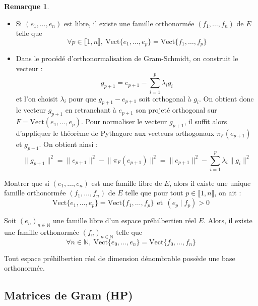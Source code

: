 \documentclass[french]{article}
\newcommand{\N}{\mathbb{N}}
\theoremstyle{plain}
\theoremstyle{definition}
\newtheorem*{rmq}{Remarque}
\theoremstyle{remark}
\begin{document}
\begin{rmq}
	\begin{itemize}
		\item Si $(e_1,\ldots,e_n)$ est libre, il existe une famille orthonormée $(f_1,\ldots,f_n)$ de $E$ telle que $$\forall p\in\llbracket 1,n\rrbracket,\ \text{Vect}\{e_1,\ldots,e_p\}=\text{Vect}\{f_1,\ldots,f_p\}$$
		\item Dans le procédé d'orthonormalisation de Gram-Schmidt, on construit le vecteur : $$g_{p+1}=e_{p+1}-\sum_{i=1}^{p}\lambda_ig_i$$ et l'on choisit $\lambda_i$ pour que $g_{p+1}-e_{p+1}$ soit orthogonal à $g_i$. On obtient donc le vecteur $g_{p+1}$ en retranchant à $e_{p+1}$ son projeté orthogonal sur $F=\text{Vect}(e_1,\ldots,e_p)$. Pour normaliser le vecteur $g_{p+1}$, il suffit alors d'appliquer le théorème de Pythagore aux vecteurs orthogonaux $\pi_F(e_{p+1})$ et $g_{p+1}$. On obtient ainsi : $$\lVert g_{p+1}\rVert^2=\lVert e_{p+1}\rVert^2-\lVert\pi_F(e_{p+1})\rVert^2=\lVert e_{p+1}\rVert^2-\sum_{i=1}^{p}\lambda_i\lVert g_i\rVert^2$$
	\end{itemize}
\end{rmq}

\begin{exo}
	Montrer que si $(e_1,\ldots,e_n)$ est une famille libre de $E$, alors il existe une unique famille orthonormée $(f_1,\ldots,f_n)$ de $E$ telle que pour tout $p\in\llbracket1,n\rrbracket$, on ait : $$\text{Vect}\{e_1,\ldots,e_p\}=\text{Vect}\{f_1,\ldots,f_p\}\ \ \text{et}\ \ (e_p\mid f_p)>0$$
\end{exo}

\begin{prop}
	Soit $(e_n)_{n\in\N}$ une famille libre d'un espace préhilbertien réel $E$. Alors, il existe une famille orthonormée $(f_n)_{n\in\N}$ telle que $$\forall n\in\N,\ \text{Vect}\{e_0,\ldots,e_n\}=\text{Vect}\{f_0,\ldots,f_n\}$$
\end{prop}

\begin{prop}[HP]
	Tout espace préhilbertien réel de dimension dénombrable possède une base orthonormée.
\end{prop}

\subsection{Matrices de Gram (HP)}
\end{document}
